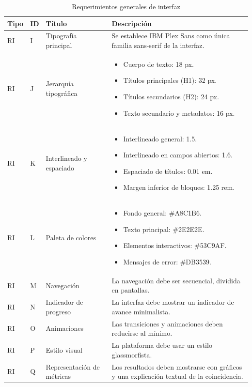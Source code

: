 \begin{table}[H]
\centering
\small
\renewcommand{\arraystretch}{1.15}
\caption{Requerimientos generales de interfaz}
\label{tab:req_int}
\begin{tabularx}{\textwidth}{%
    >{\raggedright\arraybackslash}p{}
    >{\raggedright\arraybackslash}p{}
    >{\raggedright\arraybackslash}p{}
    >{\raggedright\arraybackslash}X
}
\toprule
\textbf{Tipo} & \textbf{ID} & \textbf{Título} & \textbf{Descripción} \\
\midrule
RI & I & Tipografía principal &
Se establece IBM Plex Sans como única familia sans-serif de la interfaz. \\
RI & J & Jerarquía tipográfica &
\begin{itemize}[leftmargin=*,nosep]
    \item Cuerpo de texto: 18 px.
    \item Títulos principales (H1): 32 px.
    \item Títulos secundarios (H2): 24 px.
    \item Texto secundario y metadatos: 16 px.
\end{itemize} \\
RI & K & Interlineado y espaciado &
\begin{itemize}[leftmargin=*,nosep]
    \item Interlineado general: 1.5.
    \item Interlineado en campos abiertos: 1.6.
    \item Espaciado de títulos: 0.01 em.
    \item Margen inferior de bloques: 1.25 rem.
\end{itemize} \\
RI & L & Paleta de colores &
\begin{itemize}[leftmargin=*,nosep]
    \item Fondo general: \#A8C1B6.
    \item Texto principal: \#2E2E2E.
    \item Elementos interactivos: \#53C9AF.
    \item Mensajes de error: \#DB3539.
\end{itemize} \\
RI & M & Navegación &
La navegación debe ser secuencial, dividida en pantallas. \\
RI & N & Indicador de progreso &
La interfaz debe mostrar un indicador de avance minimalista. \\
RI & O & Animaciones &
Las transiciones y animaciones deben reducirse al mínimo. \\
RI & P & Estilo visual &
La plataforma debe usar un estilo glassmorfista. \\
RI & Q & Representación de métricas &
Los resultados deben mostrarse con gráficos y una explicación textual de la coincidencia. \\
\bottomrule
\end{tabularx}
\end{table}


